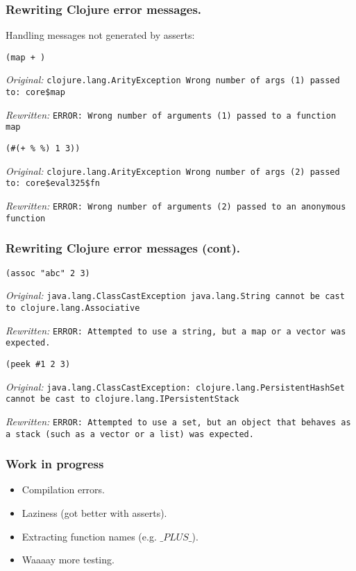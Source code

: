 \documentclass{beamer}
\begin{document}
\begin{frame}[fragile]
  \frametitle{Rewriting Clojure error messages.}
Handling messages not generated by asserts:

\vspace{.1in}

{\tt (map + )}

{\it Original:}
{\tt clojure.lang.ArityException Wrong number of args (1) passed to: core\$map}

{\it Rewritten:}
{\tt ERROR: Wrong number of arguments (1)  passed to a function map}

\vspace{.1in}

{\tt (\#(+ \% \%) 1 3))}

{\it Original:}
{\tt clojure.lang.ArityException Wrong number of args (2) passed to: core\$eval325\$fn}

{\it Rewritten:}
{\tt ERROR: Wrong number of arguments (2)  passed to an anonymous function}
 
\end{frame}

\begin{frame}[fragile]
  \frametitle{Rewriting Clojure error messages (cont).}

{\tt (assoc "abc" 2 3)}

{\it Original:}
{\tt  java.lang.ClassCastException java.lang.String cannot be cast to clojure.lang.Associative}

{\it Rewritten:}
{\tt ERROR: Attempted to use a string, but a map or a vector was expected.}

\vspace{.1in}

{\tt (peek \#{1 2 3})}

{\it Original:}
{\tt java.lang.ClassCastException: clojure.lang.PersistentHashSet cannot be cast to clojure.lang.IPersistentStack}

{\it Rewritten:}
{\tt ERROR: Attempted to use a set, but an object that behaves as a stack (such as a vector or a list) was expected.}
\end{frame}

\begin{frame}
  \frametitle{Work in progress}
\begin{itemize}
\item Compilation errors.
\item Laziness (got better with asserts). 
\item Extracting function names (e.g. $\_PLUS\_$).
\item Waaaay more testing. 
\end{itemize}
\end{frame}
\end{document}
